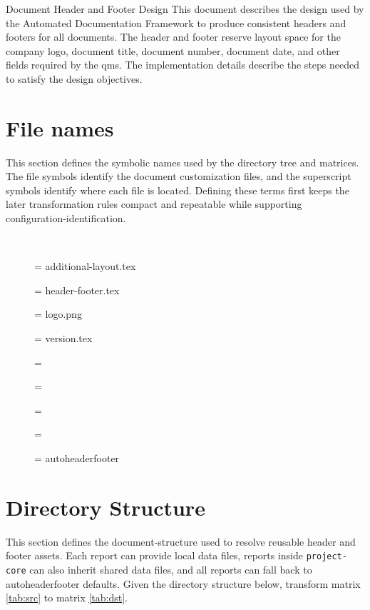 \documentclass[11pt]{tlc-article}
\begin{document}
  \tlcTitlePageAndTableOfContents
  {Document Header and Footer Design}
  {\autodocDepartmentName}
  {This document describes the design used by the Automated Documentation
    Framework to produce consistent headers and footers for all documents. The
    header and footer reserve layout space for the \gls{company} logo,
    document title, document number, document date, and other fields required by
    the \gls{qms}. The implementation details describe the steps needed to
    satisfy the design objectives.}


\section{File names}
This section defines the symbolic names used by the directory tree and matrices.
The file symbols identify the document customization files, and the superscript
symbols identify where each file is located. Defining these terms first keeps
the later transformation rules compact and repeatable while supporting
\gls{configuration-identification}.

\tlcVspace\

\begin{description}
  \item[\fa] = additional-layout.tex
  \item[\fb] = header-footer.tex
  \item[\fc] = logo.png
  \item[\fd] = version.tex
\end{description}

\begin{description}
  \item[\ra] = \raName
  \item[\rb] = \rbName
  \item[\rc] = \rcName
  \item[\rd] = \rdName
  \item[\re] = autoheaderfooter
\end{description}


\section{Directory Structure}
This section defines the \gls{document-structure} used to resolve reusable
header and footer assets. Each report can provide local data files, reports
inside \texttt{project-core} can also inherit shared data files, and all reports
can fall back to autoheaderfooter defaults. Given the directory structure below,
transform matrix \ref{tab:src} to matrix \ref{tab:dst}.
\end{document}

